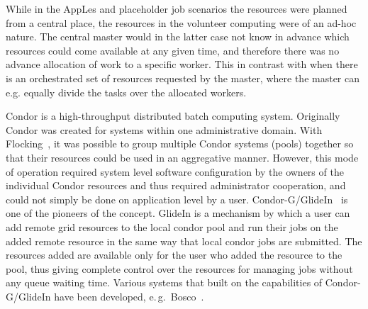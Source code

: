 \documentclass{sig-alternate}
\begin{document}
While in the AppLes and placeholder job scenarios the resources were planned
from a central place, the resources in the volunteer computing were of an
ad-hoc nature.
The central master would in the latter case not know in advance which resources
could come available at any given time, and therefore there was no advance
allocation of work to a specific worker.
This in contrast with when there is an orchestrated set of resources requested
by the master, where the master can e.g. equally divide the tasks
over the allocated workers.

Condor is a high-throughput distributed batch computing system.
Originally Condor was created for systems within one administrative domain.
With Flocking~\cite{Epema:1996:flocking}, it was possible to group multiple
Condor systems (pools) together so that their resources could be used in an
aggregative manner.
However, this mode of operation required system level software configuration by
the owners of the individual Condor resources and thus required administrator
cooperation, and could not simply be done on application level by a user.
Condor-G/GlideIn~\cite{condor-g} is one of the pioneers of the \pilotjob
concept.
GlideIn is a mechanism by which a user can add remote grid resources to the
local condor pool and run their jobs on the added remote resource in the same
way that local condor jobs are submitted.
The resources added are available only for the user who added the resource to
the pool, thus giving complete control over the resources for managing jobs
without any queue waiting time.
Various systems that built on the \pilot capabilities of Condor-G/GlideIn have
been developed, e.\,g.\ Bosco~\cite{bosco}.


\end{document}

